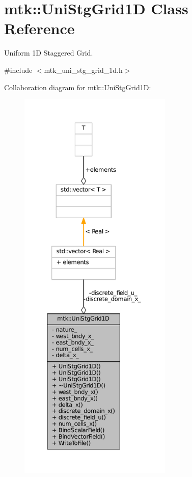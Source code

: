 \hypertarget{classmtk_1_1UniStgGrid1D}{\section{mtk\-:\-:Uni\-Stg\-Grid1\-D Class Reference}
\label{classmtk_1_1UniStgGrid1D}
}


Uniform 1\-D Staggered Grid.  




{\ttfamily \#include $<$mtk\-\_\-uni\-\_\-stg\-\_\-grid\-\_\-1d.\-h$>$}



Collaboration diagram for mtk\-:\-:Uni\-Stg\-Grid1\-D\-:
\nopagebreak
\begin{figure}[H]
\begin{center}
\leavevmode
\includegraphics[height=550pt]{classmtk_1_1UniStgGrid1D__coll__graph}
\end{center}
\end{figure}
